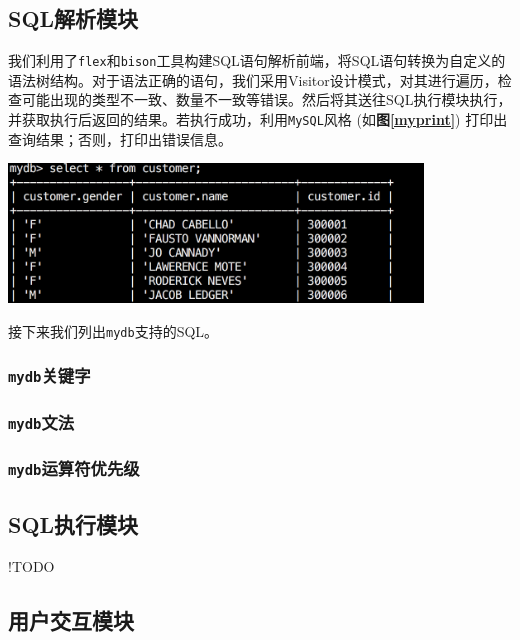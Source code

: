 \documentclass[11pt, a4paper]{article}
\makeatletter
\newcommand\fcaption{\def\@captype{figure}\caption}
\newcommand{\fref}[1]{\textbf{图\ref{#1}}}
\makeatother
\begin{document}
\subsection{SQL解析模块}

我们利用了\texttt{flex}和\texttt{bison}工具构建SQL语句解析前端，将SQL语句转换为自定义的语法树结构。对于语法正确的语句，我们采用Visitor设计模式，对其进行遍历，检查可能出现的类型不一致、数量不一致等错误。然后将其送往SQL执行模块执行，并获取执行后返回的结果。若执行成功，利用\texttt{MySQL}风格 (如\fref{myprint}) 打印出查询结果；否则，打印出错误信息。

\begin{center}
    \includegraphics[width=11cm]{fig/mysql}
    \fcaption{\texttt{MySQL}风格打印}\label{myprint}
\end{center}

接下来我们列出\texttt{mydb}支持的SQL。

\subsubsection{\texttt{mydb}关键字}



\subsubsection{\texttt{mydb}文法}



\subsubsection{\texttt{mydb}运算符优先级}



\subsection{SQL执行模块}

!TODO

\subsection{用户交互模块}
\end{document}
